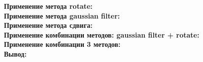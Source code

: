 \documentclass{article}
\begin{document}
\textbf{\Large Применение метода rotate:} \\

\textbf{\Large Применение метода gaussian filter:} \\

\textbf{\Large Применение метода сдвига:} \\

\textbf{\Large Применение комбинации методов: gaussian filter + rotate:} \\

\textbf{\Large Применение комбинации 3 методов:} \\

\textbf{\Large Вывод:}
\end{document}
